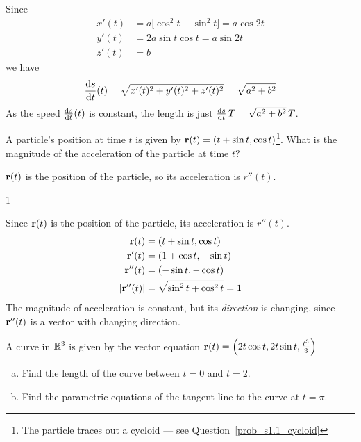 \begin{solution} 
Since
\begin{align*}
x'(t)&=a\big[\cos^2 t-\sin^2 t\big]=a\cos 2t\\
y'(t)&=2a\sin t\cos t=a\sin 2t\\
z'(t)&=b
\end{align*}
we have
\begin{equation*}
\diff{s}{t}(t)
=\sqrt{x'(t)^2+y'(t)^2+z'(t)^2}=\sqrt{a^2+b^2}
\end{equation*}
As the speed $\diff{s}{t}(t)$ is constant, the length is just
$\diff{s}{t}\,T=\sqrt{a^2+b^2}\,T$.

\end{solution}


\begin{question}
A particle's position at time $t$ is given by $\mathbf{r}(t)=(t+\sin t, \cos t)$\footnote{The particle traces out a cycloid --- see Question~\ref{prob_s1.1_cycloid}}. What is the magnitude of the acceleration of the particle at time $t$?
\end{question}
\begin{hint}
$\mathbf{r}(t)$ is the position of the particle, so its acceleration is $r''(t)$.
\end{hint}
\begin{answer}
1
\end{answer}
\begin{solution}
Since $\mathbf{r}(t)$ is the position of the particle,  its acceleration is $r''(t)$.
\begin{align*}
\mathbf{r}(t)&=(t+\sin t, \cos t)\\
\mathbf{r}'(t)&=(1+\cos t,-\sin t)\\
\mathbf{r}''(t)&=(-\sin t,-\cos t)\\
|\mathbf{r}''(t)|&=\sqrt{\sin^2t+\cos^2t}=1
\end{align*}
The magnitude of acceleration is constant, but its \emph{direction} is changing, since $\mathbf{r}''(t)$ is a vector with changing direction.
\end{solution}



\begin{question}[M317 2011D] %
A curve in $\mathbb{R}^3$ is given by the vector equation 
$\mathbf{r}(t) = \left(2t \cos t, 2t \sin t,\frac{t^3}{3}\right)$

\begin{enumerate}[(a)]
\item
Find the length of the curve between $t = 0$ and $t = 2$.

\item
Find the parametric equations of the tangent line to the curve at $t = \pi$.

\end{enumerate}
\end{question}

